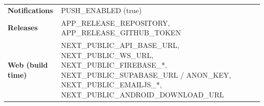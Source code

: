 {\begin{longtable}{@{}>{\raggedright\arraybackslash}p{}>{\raggedright\arraybackslash}p{}@{}}
\textbf{Notifications} & PUSH\_\allowbreak{}ENABLED (true)\\
\textbf{Releases} & APP\_\allowbreak{}RELEASE\_\allowbreak{}REPOSITORY, APP\_\allowbreak{}RELEASE\_\allowbreak{}GITHUB\_\allowbreak{}TOKEN\\
\textbf{Web (build time)} & NEXT\_\allowbreak{}PUBLIC\_\allowbreak{}API\_\allowbreak{}BASE\_\allowbreak{}URL, NEXT\_\allowbreak{}PUBLIC\_\allowbreak{}WS\_\allowbreak{}URL, NEXT\_\allowbreak{}PUBLIC\_\allowbreak{}FIREBASE\_\allowbreak{}*, NEXT\_\allowbreak{}PUBLIC\_\allowbreak{}SUPABASE\_\allowbreak{}URL /\allowbreak{} ANON\_\allowbreak{}KEY, NEXT\_\allowbreak{}PUBLIC\_\allowbreak{}EMAILJS\_\allowbreak{}*, NEXT\_\allowbreak{}PUBLIC\_\allowbreak{}ANDROID\_\allowbreak{}DOWNLOAD\_\allowbreak{}URL\\
\end{longtable}}

